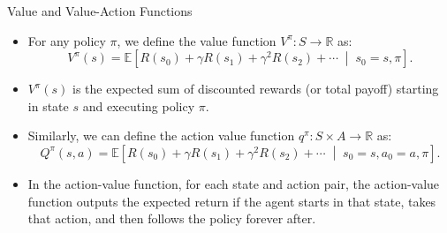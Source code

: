 \documentclass[handout]{beamer}
\begin{document}
\begin{frame}{Value and Value-Action Functions}
\scriptsize
\begin{itemize}
    \item  For any policy \( \pi \), we define the value function $V^{\pi}: S \rightarrow \mathbb{R}$ as:
    \[
    V^{\pi}(s) = \mathbb{E}\left[R(s_0) + \gamma R(s_1) + \gamma^2 R(s_2) + \cdots \;\middle|\; s_0 = s, \pi\right].
    \]
    \item \( V^{\pi}(s) \) is the expected sum of discounted rewards (or total payoff) starting in state \( s \) and executing policy \( \pi \).
       \item  Similarly, we can define the action value function $q^{\pi}: S\times A \rightarrow \mathbb{R}$ as:
    \[
    Q^{\pi}(s,a) = \mathbb{E}\left[R(s_0) + \gamma R(s_1) + \gamma^2 R(s_2) + \cdots \;\middle|\; s_0 = s,a_0=a, \pi\right].
    \]
    \item In the action-value function, for each state and action pair, the action-value function outputs the expected return if the agent starts in that state, takes that action, and then follows the policy forever after.
\end{itemize}
\end{frame}
\end{document}

